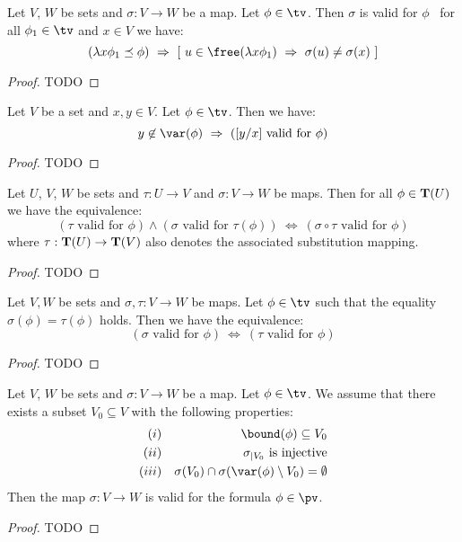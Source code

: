 \begin{prop}\label{logic:prop:LAM:validsub:criterion}
    Let $V$, $W$ be sets and $\sigma:V\to W$ be a map. Let $\phi\in\tv$. 
    Then $\sigma$ is valid for $\phi$ \ifand\ for all $\phi_{1}\in\tv$ 
    and $x\in V$ we have:
    \[
        (\lambda x\phi_{1}\preceq\phi)\ 
            \Rightarrow\ 
            [\ 
                u\in\free(\lambda x\phi_{1})\ 
                    \Rightarrow\
                \sigma(u)\neq\sigma(x)
            \ ]
    \]
\end{prop}
\begin{proof}
TODO
\end{proof}

\begin{prop}\label{logic:prop:LAM:validsub:singlevar}
    Let $V$ be a set and $x,y\in V$. Let $\phi\in\tv$. Then we have:
    \[
        y\not\in\var(\phi)\ 
            \Rightarrow\ 
        (\mbox{$[y/x]$ valid for $\phi$})
    \]
\end{prop}
\begin{proof}
TODO
\end{proof}

\begin{prop}\label{logic:prop:LAM:valid:composition}
    Let $U$, $V$, $W$ be sets and $\tau:U\to V$ and $\sigma:V\to W$ be
    maps. Then for all $\phi\in{\bf T}(U)$ we have the equivalence:
    \[
        (\mbox{$\tau$ valid for $\phi$})\land(\mbox{$\sigma$ valid for
        $\tau(\phi)$})\ 
            \Leftrightarrow\ 
        (\mbox{$\sigma\circ\tau$ valid for $\phi$})
    \]
    where $\tau:{\bf T}(U)\to{\bf T}(V)$ also denotes the associated
    substitution mapping.
\end{prop}
\begin{proof}
TODO
\end{proof}

\begin{prop}\label{logic:prop:LAM:validsub:image}
    Let $V,W$ be sets and $\sigma,\tau:V\to W$ be maps. Let $\phi\in\tv$
    such that the equality $\sigma(\phi)=\tau(\phi)$ holds. Then we have
    the equivalence:
    \[
        (\mbox{$\sigma$ valid for $\phi$})\ 
            \Leftrightarrow\
        (\mbox{$\tau$ valid for $\phi$})
    \]
\end{prop}
\begin{proof}
TODO
\end{proof}

\begin{prop}\label{logic:prop:LAM:validsub:minimalextension}
    Let $V$, $W$ be sets and $\sigma:V\to W$ be a map. Let $\phi\in\tv$.
    We assume that there exists a subset $V_{0}\subseteq V$ with the
    following properties:
    \begin{eqnarray*}
        (i)&&\bound(\phi)\subseteq V_{0}
        \\
        (ii)&&\mbox{$\sigma_{|V_{0}}$ is injective}
        \\
        (iii)&&\sigma(V_{0})\cap\sigma(\var(\phi)\setminus V_{0})=\emptyset
    \end{eqnarray*}
    Then the map $\sigma:V\to W$ is valid for the formula $\phi\in\pv$.
\end{prop}
\begin{proof}
TODO
\end{proof}
